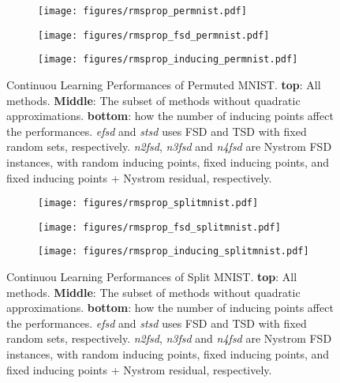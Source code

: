 \begin{figure}[h]
\centering
\begin{subfigure}[b]{\textwidth}
       \texttt{[image: figures/rmsprop\_permnist.pdf]}
      \end{subfigure}
      \hspace{2em}
\begin{subfigure}[b]{\textwidth}
       \texttt{[image: figures/rmsprop\_fsd\_permnist.pdf]}
      \end{subfigure}
      \hspace{2em}
\begin{subfigure}[b]{\textwidth}
       \texttt{[image: figures/rmsprop\_inducing\_permnist.pdf]}
      \end{subfigure}
      \hspace{2em}
\caption{Continuou Learning Performances of Permuted MNIST. \textbf{top}: All methods. \textbf{Middle}: The subset of methods without quadratic approximations. \textbf{bottom}: how the number of inducing points affect the performances. \emph{efsd} and \emph{stsd} uses FSD and TSD with fixed random sets, respectively. \emph{n2fsd}, \emph{n3fsd} and \emph{n4fsd} are Nystrom FSD instances, with random inducing points, fixed inducing points, and fixed inducing points + Nystrom residual, respectively.}
\end{figure}


\begin{figure}[h]
\centering
\begin{subfigure}[b]{\textwidth}
       \texttt{[image: figures/rmsprop\_splitmnist.pdf]}
      \end{subfigure}
      \hspace{2em}
\begin{subfigure}[b]{\textwidth}
       \texttt{[image: figures/rmsprop\_fsd\_splitmnist.pdf]}
      \end{subfigure}
      \hspace{2em}
\begin{subfigure}[b]{\textwidth}
       \texttt{[image: figures/rmsprop\_inducing\_splitmnist.pdf]}
      \end{subfigure}
      \hspace{2em}
\caption{Continuou Learning Performances of Split MNIST. \textbf{top}: All methods. \textbf{Middle}: The subset of methods without quadratic approximations. \textbf{bottom}: how the number of inducing points affect the performances. \emph{efsd} and \emph{stsd} uses FSD and TSD with fixed random sets, respectively. \emph{n2fsd}, \emph{n3fsd} and \emph{n4fsd} are Nystrom FSD instances, with random inducing points, fixed inducing points, and fixed inducing points + Nystrom residual, respectively.}
\end{figure}
